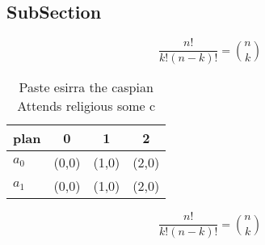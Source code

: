 \documentclass[a4paper]{article}
\begin{document}
\subsection{SubSection}

\[ \frac{n!}{k!(n-k)!} = \binom{n}{k} \]

\begin{table}
\begin{adjustbox}{width=0.6\columnwidth}
\begin{tabular}{|l|l|l|l|}
\hline
\textbf{plan} & \multicolumn{1}{c|}{\textbf{0}} & \multicolumn{1}{c|}{\textbf{1}} & \multicolumn{1}{c|}{\textbf{2}} \\ \hline
\textbf{$a_0$}  & (0,0) & (1,0) & (2,0) \\ \hline
\textbf{$a_1$}  & (0,0) & (1,0) & (2,0) \\ \hline
\end{tabular}
\end{adjustbox}
\caption{Paste esirra the caspian Attends religious some c
}
\end{table}

\[ \frac{n!}{k!(n-k)!} = \binom{n}{k} \]
\end{document}
